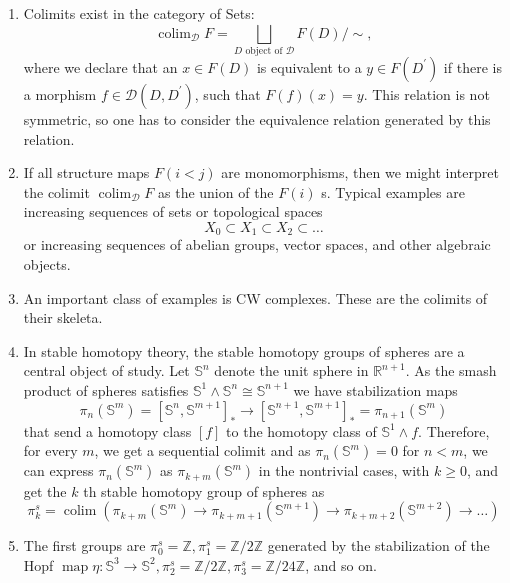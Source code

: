 \begin{example}
\begin{example}[Colimits]
    \begin{enumerate}
        \item Colimits exist in the category of Sets:
        $$
        \operatorname{colim}_{\mathcal{D}} F=\bigsqcup_{D \text { object of } \mathcal{D}} F(D) / \sim,
        $$
        where we declare that an $x \in F(D)$ is equivalent to a $y \in F\left(D^{\prime}\right)$ if there is a morphism $f \in \mathcal{D}\left(D, D^{\prime}\right)$, such that $F(f)(x)=y$. This relation is not symmetric, so one has to consider the equivalence relation generated by this relation. 
        \item If all structure maps $F(i<j)$ are monomorphisms, then we might interpret the colimit $\operatorname{colim}_{\mathcal{D}} F$ as the union of the $F(i)$ s. Typical examples are increasing sequences of sets or topological spaces
        $$
        X_0 \subset X_1 \subset X_2 \subset \ldots
        $$
        or increasing sequences of abelian groups, vector spaces, and other algebraic objects. 
        \item An important class of examples is CW complexes. These are the colimits of their skeleta.
        \item In stable homotopy theory, the stable homotopy groups of spheres are a central object of study. Let $\mathbb{S}^n$ denote the unit sphere in $\mathbb{R}^{n+1}$. As the smash product of spheres satisfies $\mathbb{S}^1 \wedge \mathbb{S}^n \cong \mathbb{S}^{n+1}$ we have stabilization maps
        $$
        \pi_n\left(\mathbb{S}^m\right)=\left[\mathbb{S}^n, \mathbb{S}^{m+1}\right]_* \rightarrow\left[\mathbb{S}^{n+1}, \mathbb{S}^{m+1}\right]_*=\pi_{n+1}\left(\mathbb{S}^m\right)
        $$
        that send a homotopy class $[f]$ to the homotopy class of $\mathbb{S}^1 \wedge f$. Therefore, for every $m$, we get a sequential colimit and as $\pi_n\left(\mathbb{S}^m\right)=0$ for $n<m$, we can express $\pi_n\left(\mathbb{S}^m\right)$ as $\pi_{k+m}\left(\mathbb{S}^m\right)$ in the nontrivial cases, with $k \geq 0$, and get the $k$ th stable homotopy group of spheres as
        $$
        \pi_k^s=\operatorname{colim}\left(\pi_{k+m}\left(\mathbb{S}^m\right) \rightarrow \pi_{k+m+1}\left(\mathbb{S}^{m+1}\right) \rightarrow \pi_{k+m+2}\left(\mathbb{S}^{m+2}\right) \rightarrow \ldots\right)
        $$
        \item The first groups are $\pi_0^s=\mathbb{Z}, \pi_1^s=\mathbb{Z} / 2 \mathbb{Z}$ generated by the stabilization of the Hopf $\operatorname{map} \eta: \mathbb{S}^3 \rightarrow \mathbb{S}^2, \pi_2^s=\mathbb{Z} / 2 \mathbb{Z}, \pi_3^s=\mathbb{Z} / 24 \mathbb{Z}$, and so on.

\end{enumerate}
\end{example}
\end{example}
